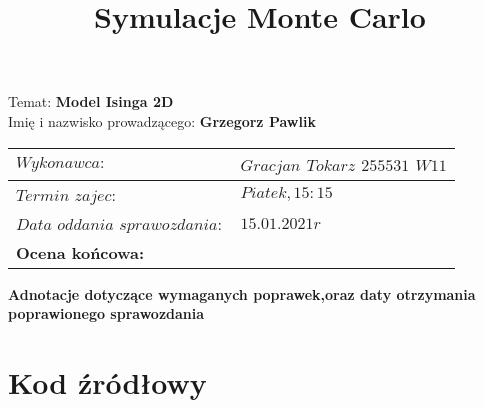 \documentclass{article}
\title{Symulacje Monte Carlo}
\date{}
\begin{document}
\maketitle
Temat: \textbf{Model Isinga 2D}\\
Imię i nazwisko prowadzącego: \textbf{Grzegorz Pawlik}

\begin{center}
\begin{tabular}{|p{5cm}|p{6cm}|}
\hline
$Wykonawca:$ & $Gracjan$ $Tokarz$ $255531$ $W11$  \\
\hline
$Termin$ $zajec:$ & $Piatek , 15:15$\\
\hline
$Data$ $oddania$ $sprawozdania:$ & $15.01.2021r$\\
\hline
\textbf{Ocena	końcowa:} & \\
\hline
\end{tabular}
\end{center}

\textbf{Adnotacje dotyczące wymaganych poprawek,oraz daty otrzymania poprawionego sprawozdania}

\newpage

\section{Kod źródłowy}
\end{document}
